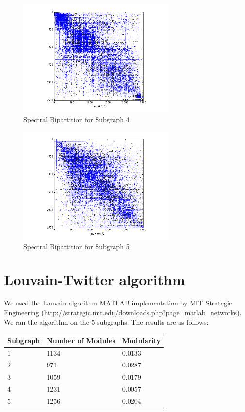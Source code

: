 \documentclass[11pt]{article}
\begin{document}
		 \begin{figure}
		 		\begin{center}
		  		\includegraphics[width=300px]{spectral_partition_a4.png}
		  	\end{center}
		  	\caption{Spectral Bipartition for Subgraph 4}
		  	\label{fig:sb4}
		 \end{figure}
		 
		 \begin{figure}
		 		\begin{center}
		  		\includegraphics[width=300px]{spectral_partition_a5.png}
		  	\end{center}
		  	\caption{Spectral Bipartition for Subgraph 5}
		  	\label{fig:sb5}
		 \end{figure}
		  

\section{Louvain-Twitter algorithm}
We used the Louvain algorithm MATLAB implementation by MIT Strategic Engineering (\url{http://strategic.mit.edu/downloads.php?page=matlab_networks}). We ran the algorithm on the 5 subgraphs. The results are as follows:

\begin{table}[!htbp]
		\begin{tabular}{lll}
		Subgraph & Number of Modules & Modularity \\
	  \hline
		1 & 1134 & 0.0133 \\
		2 & 971 & 0.0287 \\
		3 & 1059 & 0.0179 \\
		4 & 1231 & 0.0057 \\
		5 & 1256 & 0.0204 \\
		\end{tabular}
\end{table}

     
\end{document}
